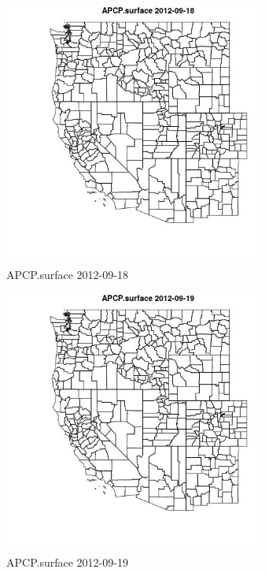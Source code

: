 \begin{figure} 
\centering  
\includegraphics[width=0.77\textwidth]{Code_Outputs/ML_input_report_ML_input_PM25_Step5_part_d_de_duplicated_aves_ML_input_MapObsAPCPsurface2012-09-18.jpg} 
\caption{\label{fig:ML_input_report_ML_input_PM25_Step5_part_d_de_duplicated_aves_ML_inputMapObsAPCPsurface2012-09-18}APCP.surface 2012-09-18} 
\end{figure} 
 

\begin{figure} 
\centering  
\includegraphics[width=0.77\textwidth]{Code_Outputs/ML_input_report_ML_input_PM25_Step5_part_d_de_duplicated_aves_ML_input_MapObsAPCPsurface2012-09-19.jpg} 
\caption{\label{fig:ML_input_report_ML_input_PM25_Step5_part_d_de_duplicated_aves_ML_inputMapObsAPCPsurface2012-09-19}APCP.surface 2012-09-19} 
\end{figure} 
 

